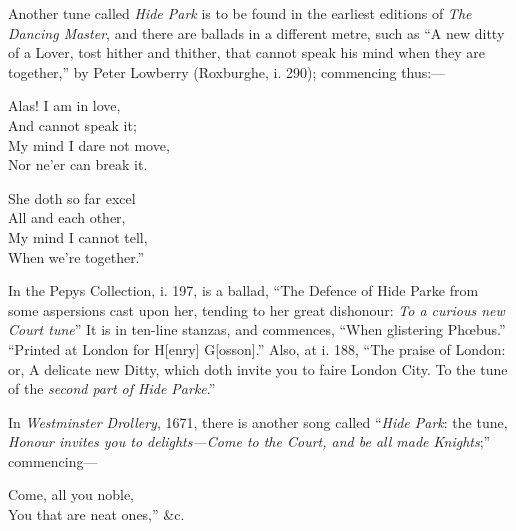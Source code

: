 Another tune called \textit{Hide Park} is to be found in the earliest editions of \textit{The
Dancing Master}, and there are ballads in a different metre, such as “A new ditty
of a Lover, tost hither and thither, that cannot speak his mind when they are
together,” by Peter Lowberry (Roxburghe, i. 290); commencing thus:—
\pagebreak
\settowidth{\versewidth}{Alas! I am in love,}
\begin{dcverse}\begin{altverse}
Alas! I am in love,\\
And cannot speak it;\\
My mind I dare not move,\\
Nor ne’er can break it.
\end{altverse}

\begin{altverse}
She doth so far excel\\
All and each other,\\
My mind I cannot tell,\\
When we’re together.”
\end{altverse}
\end{dcverse}

In the Pepys Collection, i. 197, is a ballad, “The Defence of Hide Parke from
some aspersions cast upon her, tending to her great dishonour: \textit{To a curious new
Court tune}” It is in ten-line stanzas, and commences, “When glistering Phœbus.”
“Printed at London for H[enry] G[osson].” Also, at i. 188, “The praise of
London: or, A delicate new Ditty, which doth invite you to faire London City.
To the tune of the \textit{second part of Hide Parke}.”

In \textit{Westminster Drollery}, 1671, there is another song called “\textit{Hide Park}: the
tune, \textit{Honour invites you to delights—Come to the Court, and be all made Knights};”
commencing—

\settowidth{\versewidth}{Come, all you noble,}
\begin{scverse}Come, all you noble,\\
You that are neat ones,” \&c.
\end{scverse}

